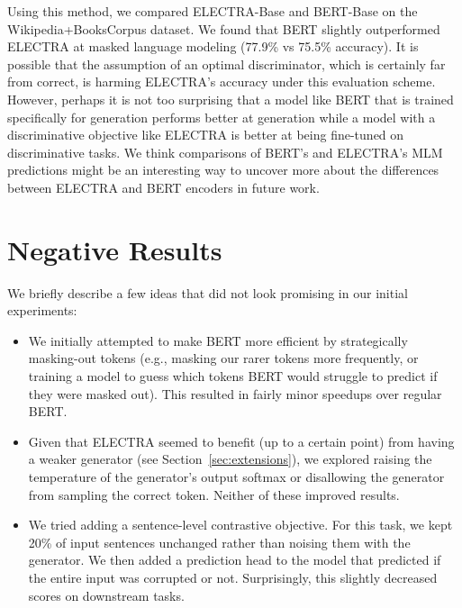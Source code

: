 \documentclass{article}
\begin{document}
Using this method, we compared ELECTRA-Base and BERT-Base on the Wikipedia+BooksCorpus dataset.
We found that BERT slightly outperformed ELECTRA at masked language modeling (77.9\% vs 75.5\% accuracy).
It is possible that the assumption of an optimal discriminator, which is certainly far from correct, is harming ELECTRA's accuracy under this evaluation scheme.
However, perhaps it is not too surprising that a model like BERT that is trained specifically for generation performs better at generation while a model with a discriminative objective like ELECTRA is better at being fine-tuned on discriminative tasks. 
We think comparisons of BERT's and ELECTRA's MLM predictions might be an interesting way to uncover more about the differences between ELECTRA and BERT encoders in future work.

\section{Negative Results}
\label{app:neg}

We briefly describe a few ideas that did not look promising in our initial experiments:
\begin{itemize}
    \item We initially attempted to make BERT more efficient by strategically masking-out tokens (e.g., masking our rarer tokens more frequently, or training a model to guess which tokens BERT would struggle to predict if they were masked out). This resulted in fairly minor speedups over regular BERT.  
    \item Given that ELECTRA seemed to benefit (up to a certain point) from having a weaker generator (see Section~\ref{sec:extensions}), we explored raising the temperature of the generator's output softmax or disallowing the generator from sampling the correct token. Neither of these improved results.
    \item We tried adding a sentence-level contrastive objective. For this task, we kept 20\% of input sentences unchanged rather than noising them with the generator. We then added a prediction head to the model that predicted if the entire input was corrupted or not. Surprisingly, this slightly decreased scores on downstream tasks.
\end{itemize}
\end{document}
